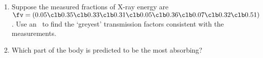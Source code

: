\begin{exercise}
\begin{enumerate}
\item Suppose the measured fractions of X-ray energy are \(\fv=(0.05\clb 0.35\clb 0.33\clb 0.31\clb 0.05\clb 0.36\clb 0.07\clb 0.32\clb 0.51)\).
\setbox\ajrqrbox\hbox{}%
\marginajrbox%
Use an \svd\ to find the `greyest' transmission factors consistent with the measurements.

\item Which part of the body is predicted to be the most absorbing?

\end{enumerate}
\end{exercise}




